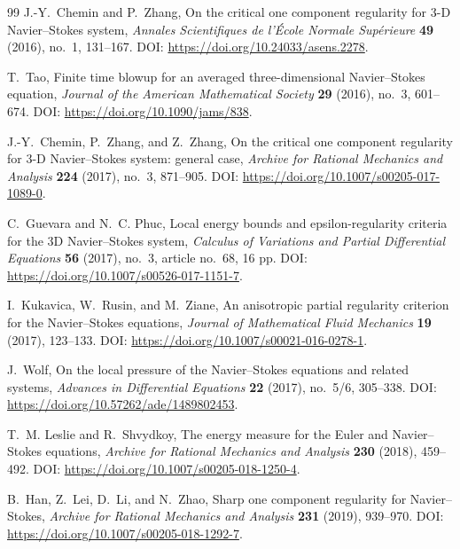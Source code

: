 \documentclass[11pt]{article}
\numberwithin{equation}{section}
\theoremstyle{plain}
\theoremstyle{definition}
\theoremstyle{remark}
\begin{document}
\begin{thebibliography}{99}
J.-Y.~Chemin and P.~Zhang,
\newblock On the critical one component regularity for 3-D Navier--Stokes system,
\newblock \emph{Annales Scientifiques de l'\'Ecole Normale Sup\'erieure} \textbf{49} (2016), no.~1, 131--167.
\newblock DOI: \url{https://doi.org/10.24033/asens.2278}.

T.~Tao,
\newblock Finite time blowup for an averaged three-dimensional Navier--Stokes equation,
\newblock \emph{Journal of the American Mathematical Society} \textbf{29} (2016), no.~3, 601--674.
\newblock DOI: \url{https://doi.org/10.1090/jams/838}.

J.-Y.~Chemin, P.~Zhang, and Z.~Zhang,
\newblock On the critical one component regularity for 3-D Navier--Stokes system: general case,
\newblock \emph{Archive for Rational Mechanics and Analysis} \textbf{224} (2017), no.~3, 871--905.
\newblock DOI: \url{https://doi.org/10.1007/s00205-017-1089-0}.

C.~Guevara and N.~C. Phuc,
\newblock Local energy bounds and epsilon-regularity criteria for the 3D Navier--Stokes system,
\newblock \emph{Calculus of Variations and Partial Differential Equations} \textbf{56} (2017), no.~3, article no.~68, 16 pp.
\newblock DOI: \url{https://doi.org/10.1007/s00526-017-1151-7}.

I.~Kukavica, W.~Rusin, and M.~Ziane,
\newblock An anisotropic partial regularity criterion for the Navier--Stokes equations,
\newblock \emph{Journal of Mathematical Fluid Mechanics} \textbf{19} (2017), 123--133.
\newblock DOI: \url{https://doi.org/10.1007/s00021-016-0278-1}.

J.~Wolf,
\newblock On the local pressure of the Navier--Stokes equations and related systems,
\newblock \emph{Advances in Differential Equations} \textbf{22} (2017), no.~5/6, 305--338.
\newblock DOI: \url{https://doi.org/10.57262/ade/1489802453}.

T.~M. Leslie and R.~Shvydkoy,
\newblock The energy measure for the Euler and Navier--Stokes equations,
\newblock \emph{Archive for Rational Mechanics and Analysis} \textbf{230} (2018), 459--492.
\newblock DOI: \url{https://doi.org/10.1007/s00205-018-1250-4}.

B.~Han, Z.~Lei, D.~Li, and N.~Zhao,
\newblock Sharp one component regularity for Navier--Stokes,
\newblock \emph{Archive for Rational Mechanics and Analysis} \textbf{231} (2019), 939--970.
\newblock DOI: \url{https://doi.org/10.1007/s00205-018-1292-7}.


\end{thebibliography}
\end{document}

